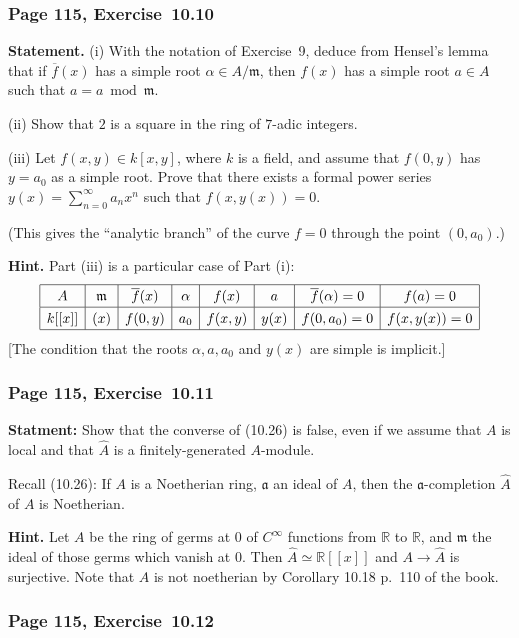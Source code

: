 \documentclass[12pt,letterpaper]{article}%
\newcommand{\mf}{\mathfrak}
\newcommand{\aaa}{\mf a}
\newcommand{\mmm}{\mf m}
\newcommand{\ov}{\overline}
\newcommand{\nn}{\noindent}
\begin{document}
\subsubsection{Page 115, Exercise~10.10}%

\textbf{Statement.} (i) With the notation of Exercise~9, deduce from Hensel's lemma that if $\ov f(x)$ has a simple root $\alpha\in A/\mmm$, then $f(x)$ has a simple root $a\in A$ such that $a=a\bmod\mmm$.

\nn(ii) Show that $2$ is a square in the ring of $7$-adic integers.

\nn(iii) Let $f(x,y)\in k[x,y]$, where $k$ is a field, and assume that $f(0,y)$ has $y=a_0$
as a simple root. Prove that there exists a formal power series $y(x)=\sum_{n=0}^\infty a_nx^n$ such that $f(x,y(x))=0$.

\nn(This gives the ``analytic branch'' of the curve $f=0$ through the point $(0,a_0)$.)

\nn\textbf{Hint.} Part (iii) is a particular case of Part (i):
$$
{\renewcommand{\arraystretch}{1.3}%
\begin{array}{|c|c|c|c|c|c|c|c|}\hline
A&\mmm&\overline f(x)&\alpha&f(x)&a&\overline f(\alpha)=0&f(a)=0\\ \hline
k[[x]]&(x)&f(0,y)&a_0&f(x,y)&y(x)&f(0,a_0)=0&f(x,y(x))=0\\ \hline
\end{array}}
$$ 
[The condition that the roots $\alpha,a,a_0$ and $y(x)$ are simple is implicit.] 

\subsubsection{Page 115, Exercise~10.11}%

\nn\textbf{Statment:} Show that the converse of (10.26) is false, even if we assume that $A$ is local and that $\widehat A$ is a finitely-generated $A$-module.

Recall (10.26): If $A$ is a Noetherian ring, $\aaa$ an ideal of $A$, then the $\aaa$-completion $\widehat A$ of $A$ is Noetherian.

\nn\textbf{Hint.} Let $A$ be the ring of germs at $0$ of $C^\infty$ functions from $\mathbb R$ to $\mathbb R$, and $\mmm$ the ideal of those germs which vanish at $0$. Then $\widehat A\simeq\mathbb R[[x]]$ and $A\to\widehat A$ is surjective. Note that $A$ is not noetherian by Corollary 10.18 p.~110 of the book. 

\subsubsection{Page 115, Exercise~10.12}%
\end{document}
